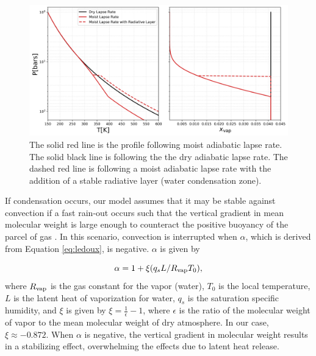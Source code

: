 \documentclass[11pt]{ucscthesisbs}
\begin{document}
\begin{figure}[ht!]
 \centerline{
  \includegraphics[width=6.5in]{figures/comparison_dry_vs_moist_lapse_rates.png}
 }
\caption[A Standard Interior Structure Model]
{The solid red line is the profile following moist adiabatic lapse rate. The solid black line is following the the dry adiabatic lapse rate. The dashed red line is following a moist adiabatic lapse rate with the addition of a stable radiative layer (water condensation zone).} 
\label{fig:comparison_adiabatic_profiles}
\end{figure}


If condensation occurs, our model assumes that it may be stable against convection if a fast rain-out occurs such that the vertical gradient in mean molecular weight is large enough to counteract the positive buoyancy of the parcel of gas \citep{leconte_2017}{} \citep{friedson_2017}. In this scenario, convection is interrupted when $\alpha$, which is derived from Equation \ref{eq:ledoux}, is negative. $\alpha$ \citep{friedson_2017} is given by

\begin{equation}
  \alpha = 1 + \xi (q_{s} L / R_{\rm vap} T_{0}) ,
  \label{eq:alpha}
\end{equation}
where $R_{\rm vap}$ is the gas constant for the vapor (water), $T_{0}$ is the local temperature, $L$ is the latent heat of vaporization for water, $q_{s}$ is the saturation specific humidity, and $\xi$ is given by $\xi = \frac{1}{\epsilon} - 1$, where $\epsilon$ is the ratio of the molecular weight of vapor to the mean molecular weight of dry atmosphere. In our case, $\xi \approx -0.872$. When $\alpha$ is negative, the vertical gradient in molecular weight results in a stabilizing effect, overwhelming the effects due to latent heat release.
\end{document}
